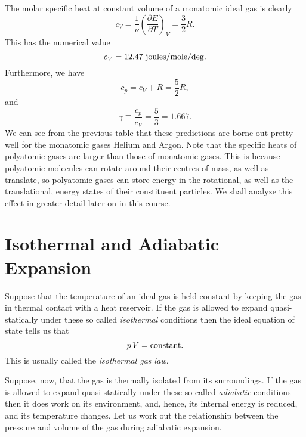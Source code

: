 The molar specific heat at constant volume of a monatomic ideal gas is 
clearly
\begin{equation}
c_V = \frac{1}{\nu} \left(\frac{\partial E}{\partial T}\right)_V = \frac{3}{2} R.
\end{equation}
This has the numerical value 
\begin{equation}
c_V = 12.47 \,\,{\rm joules/mole/deg.}
\end{equation}
Furthermore, we have
\begin{equation}
c_p = c_V + R = \frac{5}{2} R,
\end{equation}
and
\begin{equation}
\gamma \equiv \frac{c_p}{c_V} = \frac{5}{3} = 1.667.
\end{equation}
We can see from the previous table that these predictions are borne out pretty
well for the monatomic gases Helium and Argon. Note that the specific heats of
polyatomic gases are larger than those of monatomic gases. This is because 
polyatomic molecules can rotate around their centres of mass, as well as translate,
so polyatomic gases can store energy in the rotational, as well as 
the translational,
energy states of their constituent particles. We shall analyze this effect in
greater detail later on in this course.

\section{Isothermal and Adiabatic Expansion}
Suppose that  the temperature of an ideal 
 gas is held constant by keeping the gas in thermal
contact with a heat reservoir. If the gas is allowed to expand quasi-statically
under these so called {\em isothermal}\/ conditions then the ideal equation of state
tells us that
\begin{equation}
p\,V = {\rm constant}.
\end{equation}
This is usually called the {\em isothermal gas law}.

Suppose, now, that the gas is thermally isolated from its surroundings. If
the gas is allowed to expand quasi-statically under these so called 
{\em adiabatic}
conditions then 
it does work on its environment, and, hence, its internal energy is reduced,
and its temperature changes. Let us work out the relationship between the
pressure and volume of the gas during adiabatic expansion.

